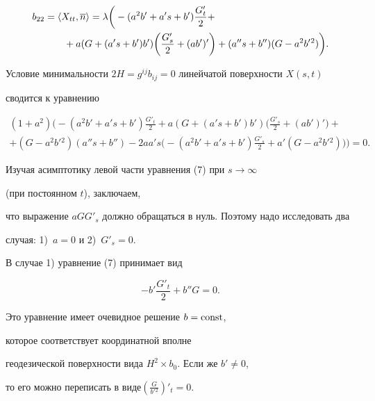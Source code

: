 \begin{pf}
\begin{align*}
%


b_{22}&=\la X_{tt}, \overline n\ra= \lambda\bigg(-(a^2b'+a's+b')\frac{G'_t}{2}+\\


%


&\qquad +a(G+(a's+b')b')\bigg( \frac{G'_s}{2}+(ab')'\bigg)+


(a''s+b'')(G-a^2b'{}^2)\bigg).


\end{align*}


Условие минимальности $2H=g^{ij}b_{ij}=0$ линейчатой поверхности $X(s,t)$ 


сводится к уравнению 


\begin{multline}


(1+a^2)\bigg(-(a^2b'+a's+b') \frac{G'_t}{2}+a(G+(a's+b')b')


\bigg( \frac{G'_s}{2}+(ab')'\bigg)+\\


+(G-a^2b'{}^2)(a''s+b'')-2aa's


\bigg(-(a^2b'+a's+b') \frac{G'_s}{2}+a'(G-a^2b'{}^2)\bigg)\bigg)=0.


\end{multline}





Изучая асимптотику левой части уравнения (7) при $s \to \infty $ 


(при постоянном $t$), заключаем, 


что выражение $aGG'_s$ должно обращаться в нуль. Поэтому надо исследовать два 


случая: 1)~$a=0$ и 2)~$G'_s=0$.





В случае 1) уравнение (7) принимает вид


\begin{equation}


-b' \frac{G'_t}{2}+b''G=0.


\end{equation}


Это уравнение имеет очевидное решение $b=\operatorname{const}$, 


которое соответствует координатной вполне 


геодезической поверхности вида $H^2 \times {b_0}$. Если же $b' \neq 0$, 


то его можно переписать в виде\linebreak $\left (\frac{G}{b'{}^2} \right )'_t=0$.



\end{pf}
